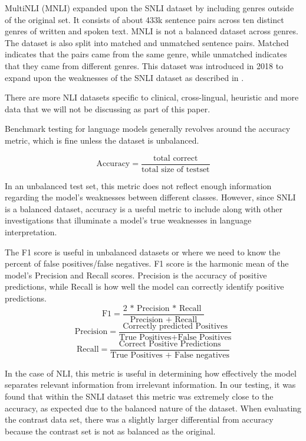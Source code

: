 \documentclass[11pt]{article}
\begin{document}
MultiNLI (MNLI) expanded upon the SNLI dataset by including genres outside of the original set. It consists of about 433k sentence pairs across ten distinct genres of written and spoken text. MNLI is not a balanced dataset across genres. The dataset is also split into matched and unmatched sentence pairs. Matched indicates that the pairs came from the same genre, while unmatched indicates that they came from different genres.  This dataset was introduced in 2018 to expand upon the weaknesses of the SNLI dataset as described in  \citealp{williams2018broadcoveragechallengecorpussentence}.

There are more NLI datasets specific to clinical, cross-lingual, heuristic and more data that we will not be discussing as part of this paper.

Benchmark testing for language models generally revolves around the accuracy metric, which is fine unless the dataset is unbalanced. 

\begin{equation*}
\text{Accuracy} = \frac{\text{total correct}}{\text{total size of testset}}
\end{equation*}

In an unbalanced test set, this metric does not reflect enough information regarding the model's weaknesses between different classes. However, since SNLI is a balanced dataset, accuracy is a useful metric to include along with other investigations that illuminate a model's true weaknesses in language interpretation.

The F1 score is useful in unbalanced datasets or where we need to know the percent of false positives/false negatives. F1 score is the harmonic mean of the model's Precision and Recall scores. Precision is the accuracy of positive predictions, while Recall is how well the model can correctly identify positive predictions.
\begin{equation*}
\text{F1} = \frac{\text{2 * Precision * Recall }}{\text{Precision + Recall}}
\end{equation*}
\begin{equation*}
\text{Precision} = \frac{\text{Correctly predicted Positives}}{\text{True Positives+False Positives}}
\end{equation*}
\begin{equation*}
\text{Recall} = \frac{\text{Correct Positive Predictions}}{\text{True Positives + False negatives}}
\end{equation*}

In the case of NLI, this metric is useful in determining how effectively the model separates relevant information from irrelevant information.  In our testing, it was found that within the SNLI dataset this metric was extremely close to the accuracy, as expected due to the balanced nature of the dataset. When evaluating the contrast data set, there was a slightly larger differential from accuracy because the contrast set is not as balanced as the original.
\end{document}
